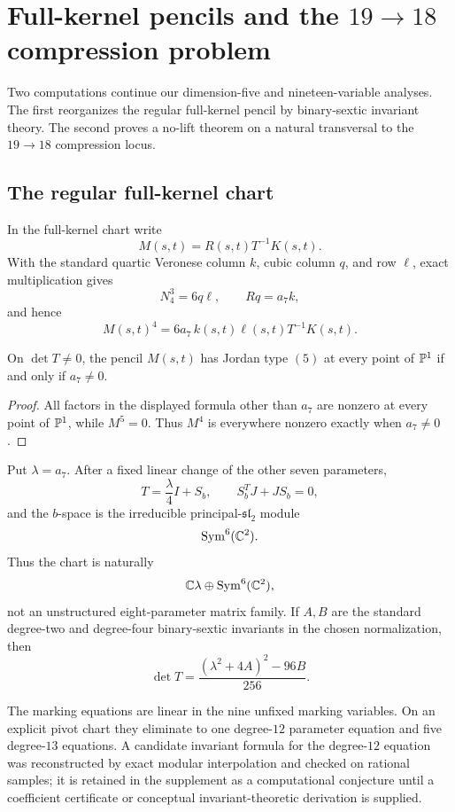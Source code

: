 \section{Full-kernel pencils and the \texorpdfstring{\(19\to18\)}{19-to-18}
  compression problem}
\label{app:full-kernel-and-compression}

Two computations continue our dimension-five and nineteen-variable analyses.
The first reorganizes the regular full-kernel pencil by binary-sextic
invariant theory.  The second proves a no-lift theorem on a natural
transversal to the \(19\to18\) compression locus.

\subsection{The regular full-kernel chart}

In the full-kernel chart write
\[
M(s,t)=R(s,t)T^{-1}K(s,t).
\]
With the standard quartic Veronese column \(k\), cubic column \(q\), and
row \(\ell\), exact multiplication gives
\[
N_4^3=6q\ell,\qquad Rq=a_7k,
\]
and hence
\[
M(s,t)^4=6a_7\,k(s,t)\ell(s,t)T^{-1}K(s,t).
\]

\begin{proposition}
\label{prop:full-kernel-regularity}
On \(\det T\ne0\), the pencil \(M(s,t)\) has Jordan type \((5)\) at every
point of \(\mathbb P^1\) if and only if \(a_7\ne0\).
\end{proposition}

\begin{proof}
All factors in the displayed formula other than \(a_7\) are nonzero at
every point of \(\mathbb P^1\), while \(M^5=0\).  Thus \(M^4\) is everywhere
nonzero exactly when \(a_7\ne0\).
\end{proof}

Put \(\lambda=a_7\).  After a fixed linear change of the other seven
parameters,
\[
T=\frac{\lambda}{4}I+S_b,
\qquad
S_b^TJ+JS_b=0,
\]
and the \(b\)-space is the irreducible principal-\(\mathfrak{sl}_2\) module
\[
\operatorname{Sym}^6(\mathbb C^2).
\]
Thus the chart is naturally
\[
\mathbb C\lambda\oplus\operatorname{Sym}^6(\mathbb C^2),
\]
not an unstructured eight-parameter matrix family.  If \(A,B\) are the
standard degree-two and degree-four binary-sextic invariants in the chosen
normalization, then
\[
\det T=\frac{(\lambda^2+4A)^2-96B}{256}.
\]

The marking equations are linear in the nine unfixed marking variables.
On an explicit pivot chart they eliminate to one degree-\(12\) parameter
equation and five degree-\(13\) equations.  A candidate invariant formula
for the degree-\(12\) equation was reconstructed by exact modular
interpolation and checked on rational samples; it is retained in the
supplement as a computational conjecture until a coefficient certificate or
conceptual invariant-theoretic derivation is supplied.

